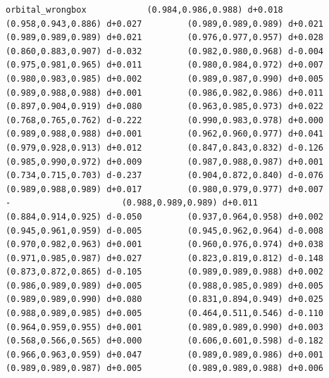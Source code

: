\documentclass[11pt, letterpaper, openany]{book}
\begin{document}
\begin{empiricalbox}
\begin{lstlisting}[style=terminal]
orbital_wrongbox            (0.984,0.986,0.988) d+0.018         (0.958,0.943,0.886) d+0.027         (0.989,0.989,0.989) d+0.021         (0.989,0.989,0.989) d+0.021         (0.976,0.977,0.957) d+0.028         (0.860,0.883,0.907) d-0.032         (0.982,0.980,0.968) d-0.004         (0.975,0.981,0.965) d+0.011         (0.980,0.984,0.972) d+0.007         (0.980,0.983,0.985) d+0.002         (0.989,0.987,0.990) d+0.005         (0.989,0.988,0.988) d+0.001         (0.986,0.982,0.986) d+0.011         (0.897,0.904,0.919) d+0.080         (0.963,0.985,0.973) d+0.022         (0.768,0.765,0.762) d-0.222         (0.990,0.983,0.978) d+0.000         (0.989,0.988,0.988) d+0.001         (0.962,0.960,0.977) d+0.041         (0.979,0.928,0.913) d+0.012         (0.847,0.843,0.832) d-0.126         (0.985,0.990,0.972) d+0.009         (0.987,0.988,0.987) d+0.001         (0.734,0.715,0.703) d-0.237         (0.904,0.872,0.840) d-0.076         (0.989,0.988,0.989) d+0.017         (0.980,0.979,0.977) d+0.007                      -                      (0.988,0.989,0.989) d+0.011         (0.884,0.914,0.925) d-0.050         (0.937,0.964,0.958) d+0.002         (0.945,0.961,0.959) d-0.005         (0.945,0.962,0.964) d-0.008         (0.970,0.982,0.963) d+0.001         (0.960,0.976,0.974) d+0.038         (0.971,0.985,0.987) d+0.027         (0.823,0.819,0.812) d-0.148         (0.873,0.872,0.865) d-0.105         (0.989,0.989,0.988) d+0.002         (0.986,0.989,0.989) d+0.005         (0.988,0.985,0.989) d+0.005         (0.989,0.989,0.990) d+0.080         (0.831,0.894,0.949) d+0.025         (0.988,0.989,0.985) d+0.005         (0.464,0.511,0.546) d-0.110         (0.964,0.959,0.955) d+0.001         (0.989,0.989,0.990) d+0.003         (0.568,0.566,0.565) d+0.000         (0.606,0.601,0.598) d-0.182         (0.966,0.963,0.959) d+0.047         (0.989,0.989,0.986) d+0.001         (0.989,0.989,0.987) d+0.005         (0.989,0.989,0.988) d+0.006     

\end{lstlisting}
\end{empiricalbox}
\end{document}
